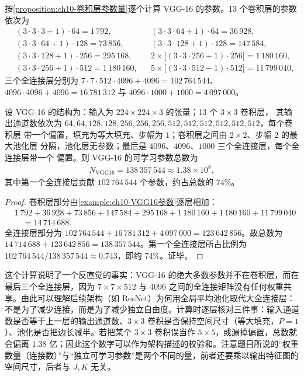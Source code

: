 \documentclass[../../main.tex]{subfiles}
\begin{document}
\begin{example}\label{example:ch10-VGG16参数}
按\cref{proposition:ch10-卷积层参数量}逐个计算 VGG-16 的参数。13 个卷积层的参数依次为
\begin{align*}
  &(3\cdot3\cdot3+1)\cdot64=1\,792, &&(3\cdot3\cdot64+1)\cdot64=36\,928,\\
  &(3\cdot3\cdot64+1)\cdot128=73\,856, &&(3\cdot3\cdot128+1)\cdot128=147\,584,\\
  &(3\cdot3\cdot128+1)\cdot256=295\,168, &&2\times\bigl[(3\cdot3\cdot256+1)\cdot256\bigr]=1\,180\,160,\\
  &(3\cdot3\cdot256+1)\cdot512=1\,180\,160, &&5\times\bigl[(3\cdot3\cdot512+1)\cdot512\bigr]=11\,799\,040,
\end{align*}
三个全连接层分别为 $7\cdot7\cdot512\cdot4096+4096=102\,764\,544$、$4096\cdot4096+4096=16\,781\,312$ 与 $4096\cdot1000+1000=4\,097\,000$。
\end{example}

\begin{proposition}\label{proposition:ch10-VGG16参数量}
设 VGG-16 的结构为：输入为 $224\times224\times3$ 的张量；13 个 $3\times3$ 卷积层，
其输出通道数依次为 $64,64,128,128,256,256,256,512,512,512,512,512,512$，每个卷积层
带一个偏置，填充为等大填充、步幅为 $1$；卷积层之间由 $2\times2$、步幅 $2$ 的最大池化层
分隔，池化层无参数；最后是 $4096$、$4096$、$1000$ 三个全连接层，每个全连接层带一个
偏置。则 VGG-16 的可学习参数总数为
\begin{align}
  N_{\mathrm{VGG16}}=138\,357\,544\approx1.38\times10^{8},
  \label{align:ch10-VGG16参数量}
\end{align}
其中第一个全连接层贡献 $102\,764\,544$ 个参数，约占总数的 $74\%$。
\end{proposition}
\begin{proof}
卷积层部分由\cref{example:ch10-VGG16参数}逐层相加：
\begin{align*}
  &1\,792+36\,928+73\,856+147\,584+295\,168+1\,180\,160+1\,180\,160+11\,799\,040\\
  &\quad=14\,714\,688 .
\end{align*}
全连接层部分为 $102\,764\,544+16\,781\,312+4\,097\,000=123\,642\,856$。故总数为 $14\,714\,688+123\,642\,856=138\,357\,544$。第一个全连接层所占比例为 $102\,764\,544/138\,357\,544\approx0.743$，即约 $74\%$。证毕。
\end{proof}

\begin{remark}
这个计算说明了一个反直觉的事实：VGG-16 的绝大多数参数并不在卷积层，而在最后三个全连接层，因为 $7\times7\times512$ 与 $4096$ 之间的全连接矩阵没有任何权重共享。由此可以理解后续架构（如 ResNet）为何用全局平均池化取代大全连接层：不是为了减少连接，而是为了减少独立自由度。计算时逐层核对三件事：输入通道数是否等于上一层的输出通道数、$3\times3$ 卷积是否保持空间尺寸（等大填充，$P=1$）、池化是否把边长减半。若把某个 $3\times3$ 卷积误当作 $5\times5$，或漏掉偏置，总数就会偏离 $1.38$ 亿；因此这个数字可以作为架构描述的校验和。注意题目所说的“权重数量（连接数）”与“独立可学习参数”是两个不同的量，前者还要乘以输出特征图的空间尺寸，后者与 $J,K$ 无关。
\end{remark}
\end{document}
